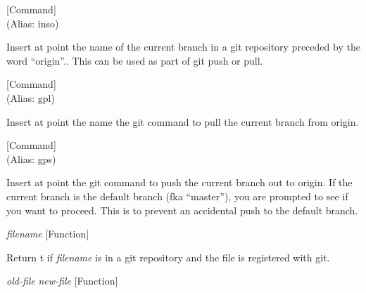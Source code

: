 \vspace{1em}
\noindent
{}
\usebox{\funcname}
 \hfill [Command]\\%
 (Alias: inso)

\begin{doc-string}
Insert at point the name of the current branch in a git repository preceded by the
word ``origin''..  This can be used as part of git push or pull.
\end{doc-string}

\vspace{1em}
\noindent
{}
\usebox{\funcname}
 \hfill [Command]\\%
 (Alias: gpl)

\begin{doc-string}
Insert at point the name the git command to pull the current branch from
origin.
\end{doc-string}

\vspace{1em}
\noindent
{}
\usebox{\funcname}
 \hfill [Command]\\%
 (Alias: gps)

\begin{doc-string}
Insert at point the git command to push the current branch out to origin.  If
the current branch is the default branch (fka ``master''), you are prompted to
see if you want to proceed.  This is to prevent an accidental push to the
default branch.
\end{doc-string}

\vspace{1em}
\noindent
{}
\usebox{\funcname}\emph{filename}
 \hfill [Function]

\begin{doc-string}
Return t if \emph{filename} is in a git repository and the file is registered with git.
\end{doc-string}

\vspace{1em}
\noindent
{}
\usebox{\funcname}\emph{old-file} \emph{new-file}
 \hfill [Function]

